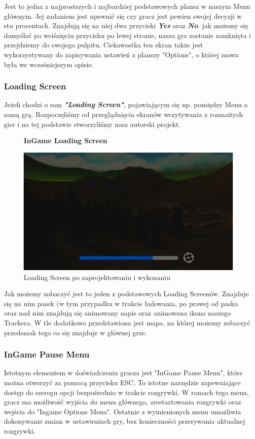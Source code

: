 Jest to jedna z najprostszych i najbardziej podstawowych plansz w naszym Menu głównym. Jej zadaniem jest upewnić się czy gracz jest pewien swojej decyzji w stu procentach. Znajdują się na niej dwa przyciski \textbf{\textit{Yes}} oraz \textbf{\textit{No}}. jak możemy się domyślać po wciśnięciu przycisku po lewej stronie, nasza gra zostanie zamknięta i przejdziemy do swojego pulpitu. Ciekawostka ten ekran także jest wykorzystywany do zapisywania ustawień z planszy "Options", o której mowa była we wcześniejszym opisie.\\

\subsubsection{Loading Screen}
Jeżeli chodzi o sam \textbf{\textit{"Loading Screen"}}, pojawiającym się np. pomiędzy Menu a samą grą. Rozpoczęliśmy od przeglądnięcia ekranów wczytywania z rozmaitych gier i na tej podstawie stworzyliśmy nasz autorski projekt.

\begin{figure}[h]
\begin{center}
{\bfseries InGame Loading Screen}
\end{center}
    \centering
    \includegraphics[width=0.75\linewidth]{Images/LoadingScreenIngame.jpg}
    \caption{Loading Screen po zaprojektowaniu i wykonaniu}
\end{figure}
\FloatBarrier

Jak możemy zobaczyć jest to jeden z podstawowych Loading Screenów. Znajduje się na nim pasek (w tym przypadku w trakcie ładowania, po prawej od paska oraz nad nim znajdują się animowany napis oraz animowana ikona naszego Trackera. W tle dodatkowo przedstawiona jest mapa, na której możemy zobaczyć przedsmak tego co się znajduje w głównej grze.

\subsubsection{InGame Pause Menu}
Istotnym elementem w doświadczeniu gracza jest "InGame Pause Menu", które można otworzyć za pomocą przycisku ESC. To istotne narzędzie zapewniające dostęp do szeregu opcji bezpośrednio w trakcie rozgrywki. W ramach tego menu, gracz ma możliwość wyjścia do menu głównego, zrestartowania rozgrywki oraz wejścia do "Ingame Options Menu". Ostatnie z wymienionych menu umożliwia dokonywanie zmian w ustawieniach gry, bez konieczności przerywania aktualnej rozgrywki.

